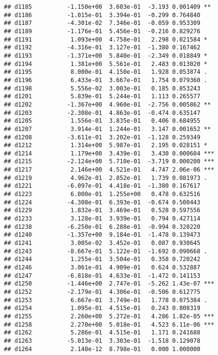 \documentclass[
]{article}
\begin{document}
\begin{verbatim}
## d1185          -1.150e+00  3.603e-01  -3.193 0.001409 ** 
## d1186          -1.015e-01  3.394e-01  -0.299 0.764840    
## d1187          -4.301e-02  7.346e-01  -0.059 0.953309    
## d1189          -1.176e-01  5.456e-01  -0.216 0.829276    
## d1191           1.093e+00  4.758e-01   2.298 0.021584 *  
## d1192          -4.316e-01  3.127e-01  -1.380 0.167462    
## d1193          -1.371e+00  5.840e-01  -2.349 0.018849 *  
## d1194           1.381e+00  5.561e-01   2.483 0.013020 *  
## d1195           8.000e-01  4.150e-01   1.928 0.053874 .  
## d1196           6.433e-01  3.667e-01   1.754 0.079360 .  
## d1198           5.556e-02  3.003e-01   0.185 0.853243    
## d1201           5.839e-01  5.244e-01   1.113 0.265577    
## d1202          -1.367e+00  4.960e-01  -2.756 0.005862 ** 
## d1203          -2.308e-01  4.863e-01  -0.474 0.635147    
## d1205           1.556e-01  3.835e-01   0.406 0.684955    
## d1207           3.914e-01  1.244e-01   3.147 0.001652 ** 
## d1208          -3.611e-01  3.202e-01  -1.128 0.259349    
## d1212           1.314e+00  5.987e-01   2.195 0.028151 *  
## d1214           1.179e+00  3.439e-01   3.430 0.000604 ***
## d1215          -2.124e+00  5.710e-01  -3.719 0.000200 ***
## d1217           2.146e+00  4.521e-01   4.747 2.06e-06 ***
## d1219           4.962e-01  2.852e-01   1.739 0.081973 .  
## d1221          -6.097e-01  4.418e-01  -1.380 0.167617    
## d1223           6.000e-01  1.255e+00   0.478 0.632516    
## d1224          -4.308e-01  6.393e-01  -0.674 0.500443    
## d1229           1.832e-01  3.469e-01   0.528 0.597556    
## d1233           3.128e-01  3.939e-01   0.794 0.427114    
## d1238          -6.250e-01  6.288e-01  -0.994 0.320220    
## d1240          -1.357e+00  9.184e-01  -1.478 0.139473    
## d1241           3.005e-02  3.452e-01   0.087 0.930645    
## d1243          -8.667e-01  5.122e-01  -1.692 0.090668 .  
## d1244           1.255e-01  3.504e-01   0.358 0.720242    
## d1246           3.061e-01  4.909e-01   0.624 0.532887    
## d1247          -6.818e-01  4.633e-01  -1.472 0.141153    
## d1250          -1.446e+00  2.747e-01  -5.262 1.43e-07 ***
## d1252          -2.179e-01  4.306e-01  -0.506 0.612775    
## d1253           6.667e-01  3.749e-01   1.778 0.075384 .  
## d1254           1.095e-01  4.515e-01   0.243 0.808319    
## d1255           2.260e+00  5.272e-01   4.286 1.82e-05 ***
## d1258           2.270e+00  5.018e-01   4.523 6.11e-06 ***
## d1262           5.286e-01  4.515e-01   1.171 0.241688    
## d1263          -5.013e-01  3.303e-01  -1.518 0.129078    
## d1264           2.148e-12  8.798e-01   0.000 1.000000    

\end{verbatim}
\end{document}
